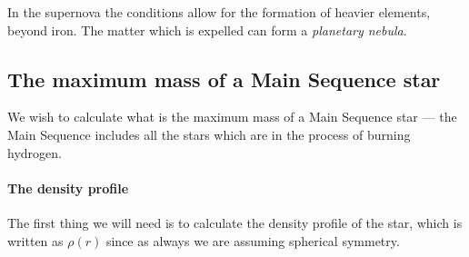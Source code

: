 \documentclass[main.tex]{subfiles}
\begin{document}
In the supernova the conditions allow for the formation of heavier elements, beyond iron.
The matter which is expelled can form a \emph{planetary nebula}.












\subsection{The maximum mass of a Main Sequence star}

We wish to calculate what is the maximum mass of a Main Sequence star --- the Main Sequence includes all the stars which are in the process of burning hydrogen. 

\paragraph{The density profile}

The first thing we will need is to calculate the density profile of the star, which is written as \(\rho (r)\) since as always we are assuming spherical symmetry. 
\end{document}
